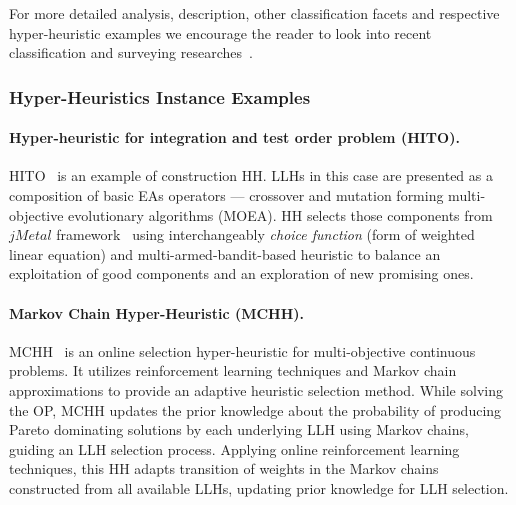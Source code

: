 
	


For more detailed analysis, description, other classification facets and respective hyper-heuristic examples we encourage the reader to look into recent classification and surveying researches~\cite{burke2003hyper,ryser2014review,drake2019recent,burke2019classification}.

\subsubsection{Hyper-Heuristics Instance Examples}\label{bg: hh examples}
\paragraph{Hyper-heuristic for integration and test order problem (HITO).} HITO~\cite{guizzo2015hyper} is an example of construction HH. LLHs in this case are presented as a composition of basic EAs operators — crossover and mutation forming multi-objective evolutionary algorithms (MOEA). HH selects those components from $jMetal$ framework~\cite{durillo2011jmetal} using interchangeably \emph{choice function} (form of weighted linear equation) and multi-armed-bandit-based heuristic to balance an exploitation of good components and an exploration of new promising ones.


\paragraph{Markov Chain Hyper-Heuristic (MCHH).} MCHH~\cite{mcclymont2011markov} is an online selection hyper-heuristic for multi-objective continuous problems. It utilizes reinforcement learning techniques and Markov chain approximations to provide an adaptive heuristic selection method. While solving the OP, MCHH updates the prior knowledge about the probability of producing Pareto dominating solutions by each underlying LLH using Markov chains, guiding an LLH selection process. Applying online reinforcement learning techniques, this HH adapts transition of weights in the Markov chains constructed from all available LLHs, updating prior knowledge for LLH selection.


